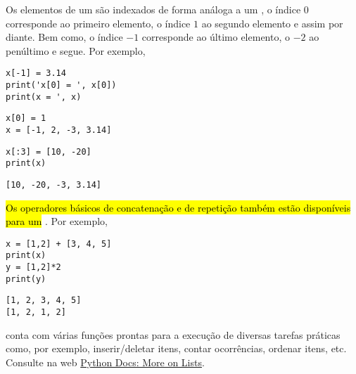 Os elementos de um {\PYTHONlist} são indexados de forma análoga a um {\PYTHONtuple}, o índice $0$ corresponde ao primeiro elemento, o índice $1$ ao segundo elemento e assim por diante. Bem como, o índice $-1$ corresponde ao último elemento, o $-2$ ao penúltimo e segue. Por exemplo,

\begin{lstlisting}
x[-1] = 3.14
print('x[0] = ', x[0])
print(x = ', x)
\end{lstlisting}

\begin{verbatim}
x[0] = 1
x = [-1, 2, -3, 3.14]
\end{verbatim}

\begin{lstlisting}
x[:3] = [10, -20]
print(x)
\end{lstlisting}

\begin{verbatim}
[10, -20, -3, 3.14]
\end{verbatim}

\hl{Os operadores básicos de concatenação e de repetição também estão disponíveis para um {\PYTHONlist}}. Por exemplo,

\begin{lstlisting}
x = [1,2] + [3, 4, 5]
print(x)
y = [1,2]*2
print(y)
\end{lstlisting}

\begin{verbatim}
[1, 2, 3, 4, 5]
[1, 2, 1, 2]
\end{verbatim}

\begin{obs}
  {\PYTHONlist} conta com várias funções prontas para a execução de diversas tarefas práticas como, por exemplo, inserir/deletar itens, contar ocorrências, ordenar itens, etc. Consulte na web \href{https://docs.python.org/3/tutorial/datastructures.html#more-on-lists}{Python Docs: More on Lists}.
\end{obs}

